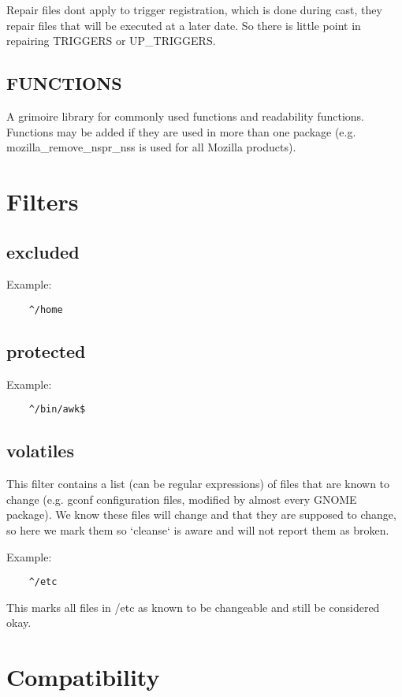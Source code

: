 \documentclass[a4paper,10pt]{book}
\begin{document}
Repair files dont apply to trigger registration, which is done during cast,
they repair files that will be executed at a later date. So there is little
point in repairing TRIGGERS or UP\_TRIGGERS.

\section{FUNCTIONS}
A grimoire library for commonly used functions and readability functions.
Functions may be added if they are used in more than one package (e.g.
mozilla\_remove\_nspr\_nss is used for all Mozilla products).

\chapter{Filters}
\section{excluded}

Example:
\begin{verbatim}
	^/home
\end{verbatim}

\section{protected}

Example:
\begin{verbatim}
	^/bin/awk$
\end{verbatim}

\section{volatiles}
This filter contains a list (can be regular expressions) of files that are
known to change (e.g. gconf configuration files, modified by almost every
GNOME package). We know these files will change and that they are supposed
to change, so here we mark them so `cleanse` is aware and will not report
them as broken.

Example:
\begin{verbatim}
	^/etc
\end{verbatim}

This marks all files in /etc as known to be changeable and still be
considered okay.

\chapter{Compatibility}
\end{document}
